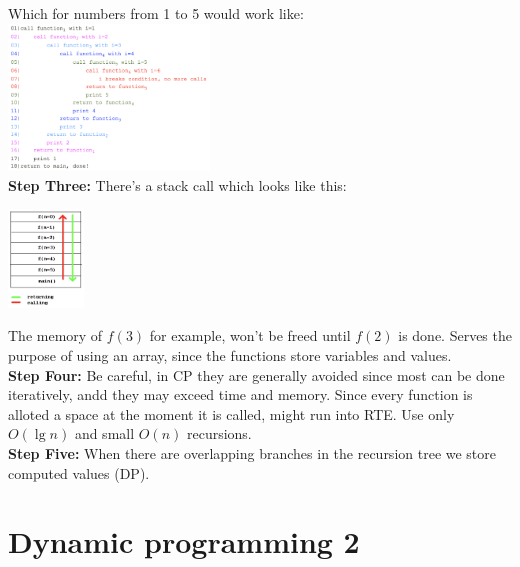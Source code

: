 \documentclass{IEEEtran}
\begin{document}
        Which for numbers from 1 to 5 would work like:\\
        \includegraphics[width=0.4\textwidth]{rofExecution.png}\\
        \textbf{Step Three:} There's a stack call which looks like this:\\
        \begin{center}
            \includegraphics[width=0.15\textwidth]{stackCalls.png}
        \end{center}
        The memory of $f(3)$ for example, won't be freed until $f(2)$ is done. Serves the purpose of using an array, since the functions store variables and values.\\
        \textbf{Step Four:} Be careful, in CP they are generally avoided since most can be done iteratively, andd they may exceed time and memory. Since every function is alloted a space at the moment it is called, might run into RTE. Use only $O(\lg{n})$ and small $O(n)$ recursions. \\
        \textbf{Step Five:} When there are overlapping branches in the recursion tree we store computed values (DP).
    \section{Dynamic programming 2}
\end{document}
